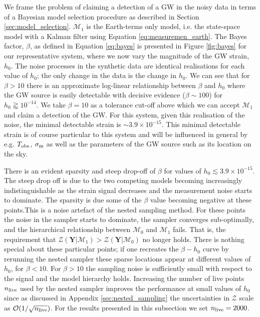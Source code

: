 \documentclass[fleqn,usenatbib,useAMS]{mnras}
\begin{document}
		
		
		
		
		
		
		
		
		
		We frame the problem of claiming a detection of a GW in the noisy data in terms of a Bayesian model selection procedure as described in Section \ref{sec:model_selection}. $\mathcal{M}_1$ is the Earth-terms only model, i.e. the state-space model with a Kalman filter using Equation \eqref{eq:measuremen_earth}. The Bayes factor, $\beta$, as defined in Equation \eqref{eq:bayes} is presented in Figure \ref{fig:bayes} for our representative system, where we now vary the magnitude of the GW strain, $h_0$. The noise processes in the synthetic data are identical realisations for each value of $h_0$; the only change in the data is the change in $h_0$. We can see that for $\beta >10$ there is an approximate log-linear relationship between $\beta$ and $h_0$ where the GW source is easily detectable with decisive evidence ($\beta \sim 100$) for $h_0 \gtrapprox 10^{-14}$. We take $\beta = 10$ as a tolerance cut-off above which we can accept $\mathcal{M}_1$ and claim a detection of the GW. For this system, given this realisation of the noise, the minimal detectable strain is $\sim 3.9 \times 10^{-15}$. This minimal detectable strain is of course particular to this system and will be influenced in general by e.g. $T_{\rm obs}$, $\sigma_{\rm m}$ as well as the parameters of the GW source such as its location on the sky. \newline 
		
		There is an evident sparsity and steep drop-off of $\beta$ for values of $h_0 \lesssim 3.9 \times10^{-15}$. The steep drop off is due to the two competing models becoming increasingly indistinguishable as the strain signal decreases and the measurement noise starts to dominate. The sparsity is due some of the $\beta$ value becoming negative at these points.This is a noise artefact of the nested sampling method. For these points the noise in the sampler starts to dominate, the sampler converges sub-optimally, and the hierarchical relationship between $\mathcal{M}_0$ and  $\mathcal{M}_1$ fails. That is, the requirement that $\mathcal{Z}(\boldsymbol{Y} | \mathcal{M}_1) > \mathcal{Z}(\boldsymbol{Y} | \mathcal{M}_0)$ no longer holds. There is nothing special about these particular points; if one recreates the $\beta - h_0$ curve by rerunning the nested sampler these sparse locations appear at different values of $h_0$, for $\beta < 10$. For $\beta > 10$ the sampling noise is sufficiently small with respect to the signal and the model hierarchy holds. Increasing the number of live points $n_{\rm live}$ used by the nested sampler improves the performance at small values of $h_0$ since as discussed in Appendix \ref{sec:nested_sampling} the uncertainties in $\mathcal{Z}$ scale as $\mathcal{O}(1/ \sqrt{n_{\rm live}})$. For the results presented in this subsection we set $n_{\rm live} =2000$. 
		
\end{document}
